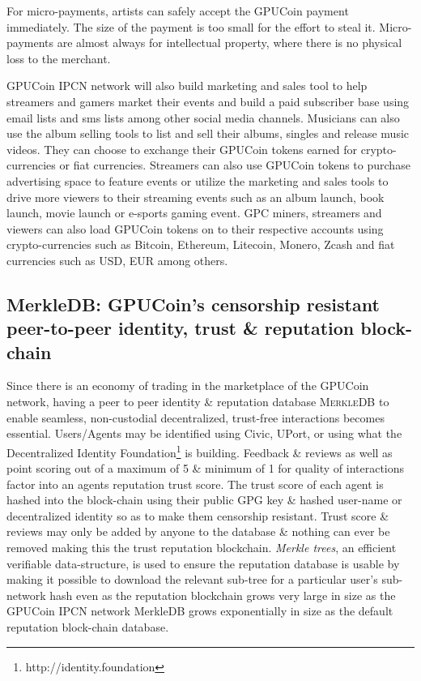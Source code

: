 \documentclass{article}
\begin{document}
For micro-payments, artists can safely accept the GPUCoin payment immediately. The size of the payment is too small for the effort to steal it. Micro-payments are almost always for intellectual property, where there is no physical loss to the merchant.

 GPUCoin IPCN network will also build marketing and sales tool to help streamers and gamers market their events and build a paid subscriber base using email lists and sms lists among other social media channels. 
Musicians can also use the album selling tools to list and sell their albums, singles and release music videos. They can choose to exchange their GPUCoin tokens earned for crypto-currencies or fiat currencies.
 Streamers can also use GPUCoin tokens to purchase advertising space to feature events or utilize the marketing and sales tools to drive more viewers to their streaming events such as an album launch, book launch, movie launch or e-sports gaming event. GPC miners, streamers and viewers can also load GPUCoin tokens on to their respective accounts using crypto-currencies such as Bitcoin, Ethereum, Litecoin, Monero, Zcash and fiat currencies such as USD, EUR among others.


\subsection{MerkleDB: GPUCoin's censorship resistant peer-to-peer identity, trust \& reputation block-chain}
Since there is an economy of trading in the marketplace of the GPUCoin network, having a peer to peer identity \& reputation database \textsc{MerkleDB} to enable seamless, non-custodial decentralized, trust-free interactions becomes essential. Users/Agents may be identified using Civic, UPort, or using what the Decentralized Identity Foundation\footnote{http://identity.foundation} is building. Feedback \& reviews as well as point scoring out of a maximum of 5 \& minimum of 1 for quality of interactions factor into an agents reputation trust score. The trust score of each agent is hashed into the block-chain using their public GPG key \& hashed user-name or decentralized identity so as to make them censorship resistant. Trust score \& reviews may only be added by anyone to the database \& nothing can ever be removed making this the trust reputation blockchain. \emph{Merkle trees}, an efficient verifiable data-structure, is used to ensure the reputation database is usable by making it possible to download the relevant sub-tree for a particular user's sub-network hash even as the reputation blockchain grows very large in size as the GPUCoin IPCN network MerkleDB grows exponentially in size as the default reputation block-chain database.

\end{document}
